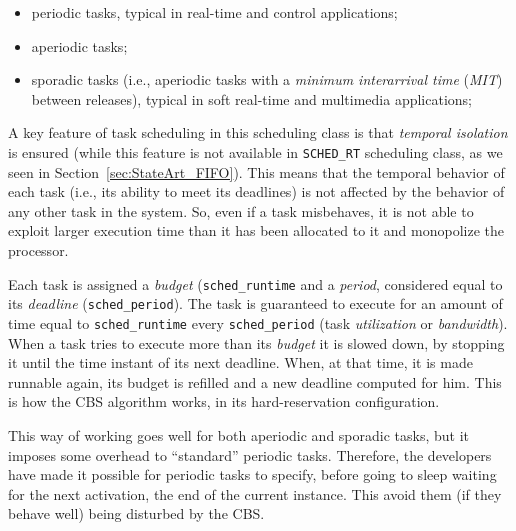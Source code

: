 \begin{itemize}
\item periodic tasks, typical in real-time and control applications;
\item aperiodic tasks;
\item sporadic tasks (i.e., aperiodic tasks with a \emph{minimum interarrival
time} (\emph{MIT}) between releases), typical in soft real-time and multimedia
applications;
\end{itemize}

A key feature of task scheduling in this scheduling class is that
\emph{temporal isolation} is ensured (while this feature is not
available in \texttt{SCHED\_RT} scheduling class, as we seen in
Section~\ref{sec:StateArt_FIFO}).  This means that the temporal
behavior of each task (i.e., its ability to meet its deadlines) is not
affected by the behavior of any other task in the system. So, even if
a task misbehaves, it is not able to exploit larger execution time
than it has been allocated to it and monopolize the processor.

Each task is assigned a \emph{budget} (\texttt{sched\_runtime} and a
\emph{period}, considered equal to its \emph{deadline} (\texttt{sched\_period}).
The task is guaranteed to execute for an amount of time equal to
\texttt{sched\_runtime} every \texttt{sched\_period} (task \emph{utilization} or
\emph{bandwidth}). When a task tries to execute more than its \emph{budget} it
is slowed down, by stopping it until the time instant of its next deadline.
When, at that time, it is made runnable again, its budget is refilled and a new
deadline computed for him. This is how the CBS algorithm works, in its
hard-reservation configuration.

This way of working goes well for both aperiodic and sporadic tasks, but it
imposes some overhead to ``standard'' periodic tasks. Therefore, the developers
have made it possible for periodic tasks to specify, before going to sleep
waiting for the next activation, the end of the current instance. This avoid
them (if they behave well) being disturbed by the CBS.


